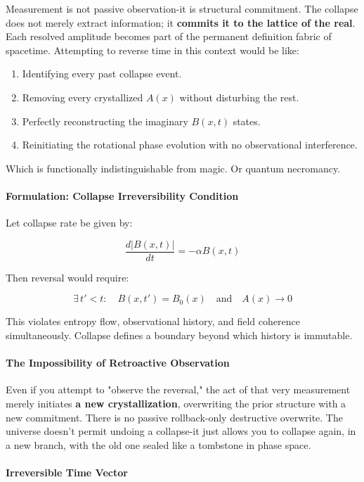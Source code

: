 Measurement is not passive observation-it is structural commitment. \cite{chapter_time} The collapse does not merely extract information; it \textbf{commits it to the lattice of the real}. \cite{chapter_time} Each resolved amplitude becomes part of the permanent definition fabric of spacetime. Attempting to reverse time in this context would be like:

\begin{enumerate}
  \item Identifying every past collapse event. \cite{chapter_time} \item Removing every crystallized $A(x)$ without disturbing the rest. \item Perfectly reconstructing the imaginary $B(x,t)$ states. \cite{chapter_time} \item Reinitiating the rotational phase evolution with no observational interference. \cite{chapter_time} \end{enumerate}

Which is functionally indistinguishable from magic. Or quantum necromancy. \cite{chapter_time} \paragraph{Formulation: Collapse Irreversibility Condition}

Let collapse rate be given by:

\[
\frac{d|B(x,t)|}{dt} = -\alpha B(x,t)
\]

Then reversal would require:

\[
\exists \, t' < t: \quad B(x,t') = B_0(x) \quad \text{and} \quad A(x) \to 0
\]

This violates entropy flow, observational history, and field coherence simultaneously. \cite{chapter_time} Collapse defines a boundary beyond which history is immutable. \cite{chapter_time} \paragraph{The Impossibility of Retroactive Observation}

Even if you attempt to "observe the reversal," the act of that very measurement merely initiates \textbf{a new crystallization}, overwriting the prior structure with a new commitment. \cite{chapter_time} There is no passive rollback-only destructive overwrite. The universe doesn’t permit undoing a collapse-it just allows you to collapse again, in a new branch, with the old one sealed like a tombstone in phase space. \cite{chapter_time} \paragraph{Irreversible Time Vector}

